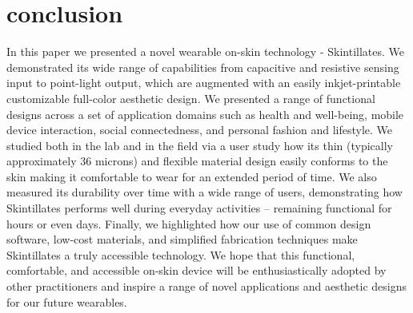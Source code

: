 \documentclass{sigchi}
\begin{document}
\section {conclusion}
In this paper we presented a novel wearable on-skin technology - Skintillates.  We demonstrated its wide range of capabilities from capacitive and resistive sensing input to point-light output, which are augmented with an easily inkjet-printable customizable full-color aesthetic design.  We presented a range of functional designs across a set of application domains such as health and well-being, mobile device interaction, social connectedness, and personal fashion and lifestyle. We studied both in the lab and in the field via a user study how its thin (typically approximately 36 microns) and flexible material design easily conforms to the skin making it comfortable to wear for an extended period of time. We also measured its durability over time with a wide range of users, demonstrating how Skintillates performs well during everyday activities -- remaining functional for hours or even days. Finally, we highlighted how our use of common design software, low-cost materials, and simplified fabrication techniques make Skintillates a truly accessible technology.  We hope that this functional, comfortable, and accessible on-skin  device will be enthusiastically adopted by other practitioners and inspire a range of novel applications and aesthetic designs for our future wearables.







%
%
%
%
%
\balance



\end{document}

